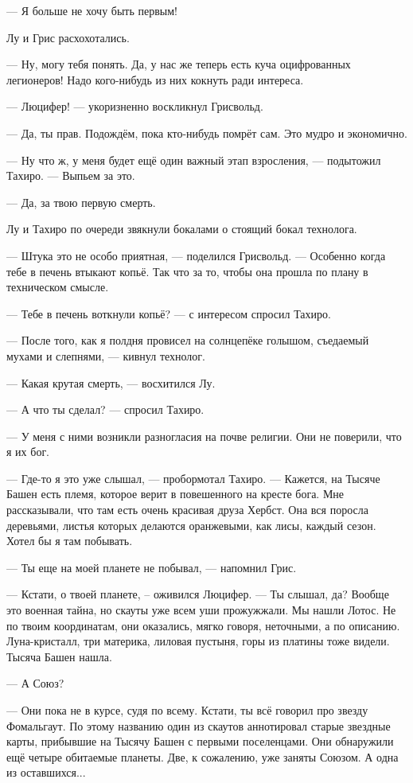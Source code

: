 --- Я больше не хочу быть первым!

Лу и Грис расхохотались.

--- Ну, могу тебя понять.
Да, у нас же теперь есть куча оцифрованных легионеров!
Надо кого-нибудь из них кокнуть ради интереса.

--- Люцифер! --- укоризненно воскликнул Грисвольд.

--- Да, ты прав.
Подождём, пока кто-нибудь помрёт сам.
Это мудро и экономично.

--- Ну что ж, у меня будет ещё один важный этап взросления, --- подытожил Тахиро.
--- Выпьем за это.

--- Да, за твою первую смерть.

Лу и Тахиро по очереди звякнули бокалами о стоящий бокал технолога.

--- Штука это не особо приятная, --- поделился Грисвольд.
--- Особенно когда тебе в печень втыкают копьё.
Так что за то, чтобы она прошла по плану в техническом смысле.

--- Тебе в печень воткнули копьё? --- с интересом спросил Тахиро.

--- После того, как я полдня провисел на солнцепёке голышом, съедаемый мухами и слепнями, --- кивнул технолог.

--- Какая крутая смерть, --- восхитился Лу.

--- А что ты сделал? --- спросил Тахиро.

--- У меня с ними возникли разногласия на почве религии.
Они не поверили, что я их бог.

--- Где-то я это уже слышал, --- пробормотал Тахиро.
--- Кажется, на Тысяче Башен есть племя, которое верит в повешенного на кресте бога.
Мне рассказывали, что там есть очень красивая друза Хербст.
Она вся поросла деревьями, листья которых делаются оранжевыми, как лисы, каждый сезон.
Хотел бы я там побывать.

--- Ты еще на моей планете не побывал, --- напомнил Грис.

--- Кстати, о твоей планете, -- оживился Люцифер.
--- Ты слышал, да?
Вообще это военная тайна, но скауты уже всем уши прожужжали.
Мы нашли Лотос.
Не по твоим координатам, они оказались, мягко говоря, неточными, а по описанию.
Луна-кристалл, три материка, лиловая пустыня, горы из платины тоже видели.
Тысяча Башен нашла.

--- А Союз?

--- Они пока не в курсе, судя по всему.
Кстати, ты всё говорил про звезду Фомальгаут.
По этому названию один из скаутов аннотировал старые звездные карты, прибывшие на Тысячу Башен с первыми поселенцами.
Они обнаружили ещё четыре обитаемые планеты.
Две, к сожалению, уже заняты Союзом.
А одна из оставшихся...

